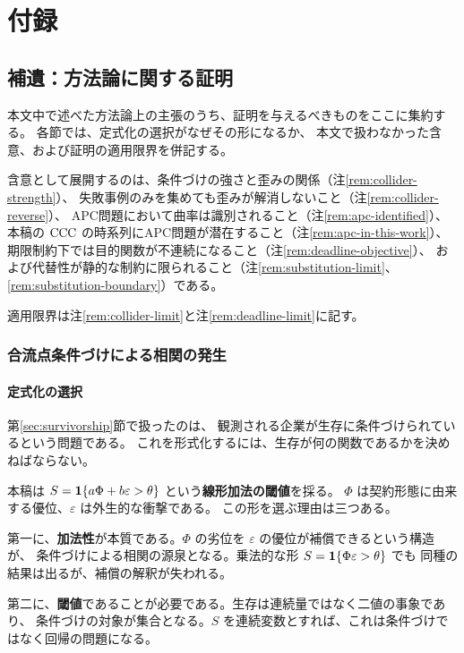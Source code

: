 \appendix
\part{付録}

\chapter{補遺：方法論に関する証明}
\label{app:proofs}

本文中で述べた方法論上の主張のうち、証明を与えるべきものをここに集約する。
各節では、定式化の選択がなぜその形になるか、
本文で扱わなかった含意、および証明の適用限界を併記する。

含意として展開するのは、条件づけの強さと歪みの関係（注\ref{rem:collider-strength}）、
失敗事例のみを集めても歪みが解消しないこと（注\ref{rem:collider-reverse}）、
APC問題において曲率は識別されること（注\ref{rem:apc-identified}）、
本稿の $\mathrm{CCC}$ の時系列にAPC問題が潜在すること（注\ref{rem:apc-in-this-work}）、
期限制約下では目的関数が不連続になること（注\ref{rem:deadline-objective}）、
および代替性が静的な制約に限られること（注\ref{rem:substitution-limit}、\ref{rem:substitution-boundary}）である。

適用限界は注\ref{rem:collider-limit}と注\ref{rem:deadline-limit}に記す。

\section{合流点条件づけによる相関の発生}

\subsection{定式化の選択}

第\ref{sec:survivorship}節で扱ったのは、
観測される企業が生存に条件づけられているという問題である。
これを形式化するには、生存が何の関数であるかを決めねばならない。

本稿は $S = \mathbf{1}\{a\Phi + b\varepsilon > \theta\}$ という\textbf{線形加法の閾値}を採る。
$\Phi$ は契約形態に由来する優位、$\varepsilon$ は外生的な衝撃である。
この形を選ぶ理由は三つある。

第一に、\textbf{加法性}が本質である。$\Phi$ の劣位を $\varepsilon$ の優位が補償できるという構造が、
条件づけによる相関の源泉となる。乗法的な形 $S=\mathbf{1}\{\Phi\varepsilon>\theta\}$ でも
同種の結果は出るが、補償の解釈が失われる。

第二に、\textbf{閾値}であることが必要である。生存は連続量ではなく二値の事象であり、
条件づけの対象が集合となる。$S$ を連続変数とすれば、これは条件づけではなく回帰の問題になる。

